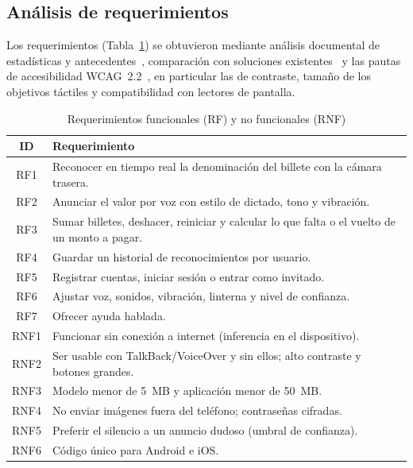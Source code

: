 \documentclass[conference,a4paper]{IEEEtran}
\begin{document}
\subsection{Análisis de requerimientos}

Los requerimientos (Tabla~\ref{tab:req}) se obtuvieron mediante análisis documental de estadísticas y antecedentes~\cite{who2019,inei2019,caytuiro2023}, comparación con soluciones existentes~\cite{cashreader,mushtaq2025,ghanem2025,shreya2025} y las pautas de accesibilidad WCAG~2.2~\cite{wcag22}, en particular las de contraste, tamaño de los objetivos táctiles y compatibilidad con lectores de pantalla.

\begin{table}[!t]
\caption{Requerimientos funcionales (RF) y no funcionales (RNF)}
\label{tab:req}
\centering
\footnotesize
\begin{tabular}{|c|p{6.9cm}|}
\hline
\textbf{ID} & \textbf{Requerimiento} \\
\hline
RF1 & Reconocer en tiempo real la denominación del billete con la cámara trasera. \\
RF2 & Anunciar el valor por voz con estilo de dictado, tono y vibración. \\
RF3 & Sumar billetes, deshacer, reiniciar y calcular lo que falta o el vuelto de un monto a pagar. \\
RF4 & Guardar un historial de reconocimientos por usuario. \\
RF5 & Registrar cuentas, iniciar sesión o entrar como invitado. \\
RF6 & Ajustar voz, sonidos, vibración, linterna y nivel de confianza. \\
RF7 & Ofrecer ayuda hablada. \\
\hline
RNF1 & Funcionar sin conexión a internet (inferencia en el dispositivo). \\
RNF2 & Ser usable con TalkBack/VoiceOver y sin ellos; alto contraste y botones grandes. \\
RNF3 & Modelo menor de 5~MB y aplicación menor de 50~MB. \\
RNF4 & No enviar imágenes fuera del teléfono; contraseñas cifradas. \\
RNF5 & Preferir el silencio a un anuncio dudoso (umbral de confianza). \\
RNF6 & Código único para Android e iOS. \\
\hline
\end{tabular}
\end{table}
\end{document}
